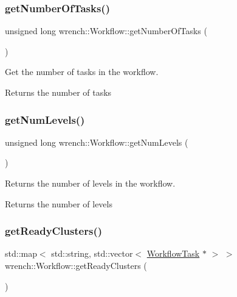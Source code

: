 \subsubsection{\texorpdfstring{get\+Number\+Of\+Tasks()}{getNumberOfTasks()}}
{\footnotesize\ttfamily unsigned long wrench\+::\+Workflow\+::get\+Number\+Of\+Tasks (\begin{DoxyParamCaption}{ }\end{DoxyParamCaption})}



Get the number of tasks in the workflow. 

\begin{DoxyReturn}{Returns}
the number of tasks 
\end{DoxyReturn}
\mbox{\label{classwrench_1_1_workflow_a15f12b7d5088e8e1e2130545c2b795ea}} 
\subsubsection{\texorpdfstring{get\+Num\+Levels()}{getNumLevels()}}
{\footnotesize\ttfamily unsigned long wrench\+::\+Workflow\+::get\+Num\+Levels (\begin{DoxyParamCaption}{ }\end{DoxyParamCaption})}



Returns the number of levels in the workflow. 

\begin{DoxyReturn}{Returns}
the number of levels 
\end{DoxyReturn}
\mbox{\label{classwrench_1_1_workflow_a875d3d3a26eba6316e249169814b853f}} 
\subsubsection{\texorpdfstring{get\+Ready\+Clusters()}{getReadyClusters()}}
{\footnotesize\ttfamily std\+::map$<$ std\+::string, std\+::vector$<$ \hyperlink{classwrench_1_1_workflow_task}{Workflow\+Task} $\ast$ $>$ $>$ wrench\+::\+Workflow\+::get\+Ready\+Clusters (\begin{DoxyParamCaption}{ }\end{DoxyParamCaption})}



